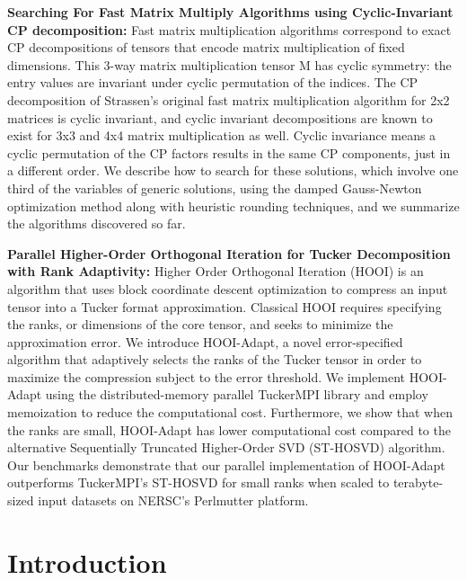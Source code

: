 \documentclass[MS]{wfuthesis}
\begin{document}
    \textbf{Searching For Fast Matrix Multiply Algorithms using Cyclic-Invariant
    CP decomposition:} Fast matrix multiplication algorithms correspond to exact
    CP decompositions of tensors that encode matrix multiplication of fixed
    dimensions. This 3-way matrix multiplication tensor M has cyclic symmetry:
    the entry values are invariant under cyclic permutation of the indices. The
    CP decomposition of Strassen’s original fast matrix multiplication algorithm
    for 2x2 matrices is cyclic invariant, and cyclic invariant decompositions
    are known to exist for 3x3 and 4x4 matrix multiplication as well. Cyclic
    invariance means a cyclic permutation of the CP factors results in the same
    CP components, just in a different order. We describe how to search for
    these solutions, which involve one third of the variables of generic
    solutions, using the damped Gauss-Newton optimization method along with
    heuristic rounding techniques, and we summarize the algorithms discovered so
    far.

    \textbf{Parallel Higher-Order Orthogonal Iteration for Tucker Decomposition
    with Rank Adaptivity:} Higher Order Orthogonal Iteration (HOOI) is an
    algorithm that uses block coordinate descent optimization to compress an
    input tensor into a Tucker format approximation. Classical HOOI requires
    specifying the ranks, or dimensions of the core tensor, and seeks to
    minimize the approximation error. 	We introduce HOOI-Adapt, a novel
    error-specified algorithm that adaptively selects the ranks of the Tucker
    tensor in order to maximize the compression subject to the error threshold.
    We implement HOOI-Adapt using the distributed-memory parallel TuckerMPI
    library and employ memoization to reduce the computational cost.
    Furthermore, we show that when the ranks are small, HOOI-Adapt has lower
    computational cost compared to the alternative Sequentially Truncated
    Higher-Order SVD (ST-HOSVD) algorithm. Our benchmarks demonstrate that our
    parallel implementation of HOOI-Adapt outperforms TuckerMPI’s ST-HOSVD for
    small ranks when scaled to terabyte-sized input datasets on NERSC’s
    Perlmutter platform.





    \chapters{}
    \chapter{\textbf{Introduction}}
\end{document}
